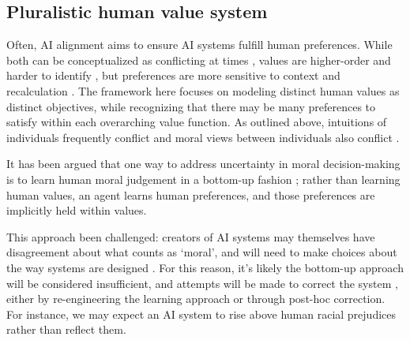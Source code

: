 




\subsection{Pluralistic human value system}

Often, AI alignment aims to ensure AI systems fulfill human preferences. While both can be conceptualized as conflicting at times \cite{sotala2016defining}, values are higher-order and harder to identify \cite{barrett2008learning}, but preferences are more sensitive to context and recalculation \cite{warren2011values}. The framework here focuses on modeling distinct human values as distinct objectives, while recognizing that there may be many preferences to satisfy within each overarching value function. As outlined above, intuitions of individuals frequently conflict \cite{haidt2001emotional} and moral views between individuals also conflict \cite{bogosian_implementation_2017}.

It has been argued that one way to address uncertainty in moral decision-making is to learn human moral judgement in a bottom-up fashion \cite{bogosian_implementation_2017}; rather than learning human values, an agent learns human preferences, and those preferences are implicitly held within values. 

This approach been challenged: creators of AI systems may themselves have disagreement about what counts as `moral', and will need to make choices about the way systems are designed  \cite{bogosian_implementation_2017}. For this reason, it's likely the bottom-up approach will be considered insufficient, and attempts will be made to correct the system \cite{stray2020you}, either by re-engineering the learning approach or through post-hoc correction. For instance, we may expect an AI system to rise above human racial prejudices rather than reflect them. 

